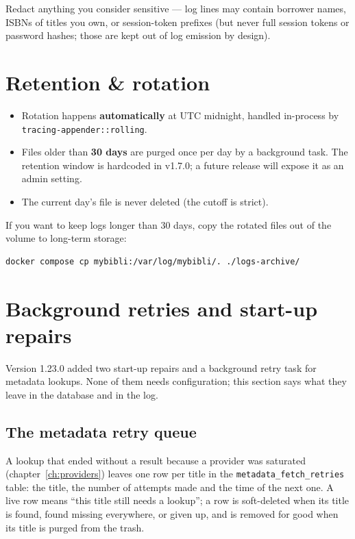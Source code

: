 Redact anything you consider sensitive — log lines may contain
borrower names, ISBNs of titles you own, or session-token prefixes
(but never full session tokens or password hashes; those are kept
out of log emission by design).

\section{Retention \& rotation}

\begin{itemize}
  \item Rotation happens \textbf{automatically} at UTC midnight,
        handled in-process by \texttt{tracing-appender::rolling}.
  \item Files older than \textbf{30 days} are purged once per day by
        a background task. The retention window is hardcoded in
        v1.7.0; a future release will expose it as an admin setting.
  \item The current day's file is never deleted (the cutoff is
        strict).
\end{itemize}

If you want to keep logs longer than 30 days, copy the rotated files
out of the volume to long-term storage:

\begin{lstlisting}
docker compose cp mybibli:/var/log/mybibli/. ./logs-archive/
\end{lstlisting}

\section{Background retries and start-up repairs}
\label{sec:startup-repairs}

Version 1.23.0 added two start-up repairs and a background retry task
for metadata lookups. None of them needs configuration; this section says
what they leave in the database and in the log.

\subsection*{The metadata retry queue}

A lookup that ended without a result because a provider was saturated
(chapter~\ref{ch:providers}) leaves one row per title in the
\texttt{metadata\_fetch\_retries}
table: the title, the number of attempts made and the time of the next
one. A live row means ``this title still needs a lookup''; a row is
soft-deleted when its title is found, found missing everywhere, or
given up, and is removed for good when its title is purged from the
trash.

